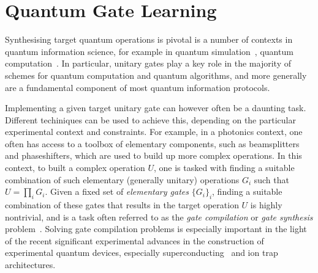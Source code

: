 
\chapter{Quantum Gate Learning}
\label{Section:GateLearning}

Synthesising target quantum operations is pivotal is a number of contexts in quantum information science, for example in quantum simulation~\cite{feynman1982simulating,lloyd1996universal}, quantum computation~\cite{feynman1982simulating,deutsch1985quantum,gottesman1998theory,nielsen2002quantum,ladd2010quantum}.
In particular, unitary gates play a key role in the majority of schemes for quantum computation and quantum algorithms, and more generally are a fundamental component of most quantum information protocols.

Implementing a given target unitary gate can however often be a daunting task. Different techiniques can be used to achieve this, depending on the particular experimental context and constraints.
For example, in a photonics context, one often has access to a toolbox of elementary components, such as beamsplitters and phaseshifters, which are used to build up more complex operations.
In this context, to built a complex operation $U$, one is tasked with finding a suitable combination of such elementary (generally unitary) operations $G_i$ such that $U=\prod_i G_i$. Given a fixed set of \textit{elementary gates} $\{G_i\}_i$, finding a suitable combination of these gates that results in the target operation $U$ is highly nontrivial, and is a task often referred to as the \textit{gate compilation} or \textit{gate synthesis} problem~\cite{mottonen2004quantum,nielsen2006quantum,loke2014optqc,loke2016optqc,nakajima2009synthesis,maslov2017basic,swaddle2017generating}. 
Solving gate compilation problems is especially important in the light of the recent significant experimental advances in the construction of experimental quantum devices, especially superconducting~\cite{devoret2013superconducting} and ion trap~\cite{blatt2008entangled,debnath2016demonstration} architectures.

